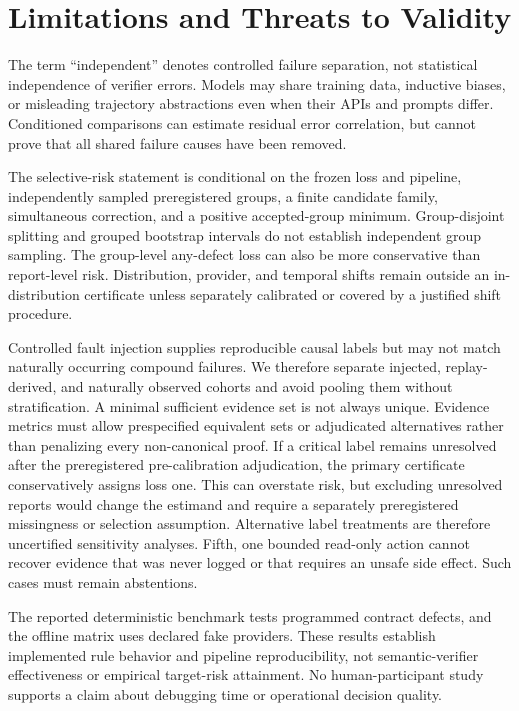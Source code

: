 \section{Limitations and Threats to Validity}
\label{sec:limitations}

The term ``independent'' denotes controlled failure separation, not statistical
independence of verifier errors. Models may share training data, inductive
biases, or misleading trajectory abstractions even when their APIs and prompts
differ. Conditioned comparisons can estimate residual error correlation, but
cannot prove that all shared failure causes have been removed.

The selective-risk statement is conditional on the frozen loss and pipeline,
independently sampled preregistered groups, a finite candidate family,
simultaneous correction, and a positive accepted-group minimum. Group-disjoint
splitting and grouped bootstrap intervals do not establish independent group
sampling. The group-level any-defect loss can also be more conservative than
report-level risk. Distribution, provider, and temporal shifts remain outside
an in-distribution certificate unless separately calibrated or covered by a
justified shift procedure.

Controlled fault injection supplies reproducible causal labels but may
not match naturally occurring compound failures. We therefore separate
injected, replay-derived, and naturally observed cohorts and avoid pooling them
without stratification. A minimal sufficient evidence set is not always
unique. Evidence metrics must allow prespecified equivalent sets or adjudicated
alternatives rather than penalizing every non-canonical proof. If a critical
label remains unresolved after the preregistered pre-calibration adjudication,
the primary certificate conservatively assigns loss one. This can overstate
risk, but excluding unresolved reports would change the estimand and require a
separately preregistered missingness or selection assumption. Alternative label
treatments are therefore uncertified sensitivity analyses. Fifth, one bounded
read-only action cannot recover evidence that was never logged or that requires
an unsafe side effect. Such cases must remain abstentions.

The reported deterministic benchmark tests programmed contract defects, and
the offline matrix uses declared fake providers. These results establish
implemented rule behavior and pipeline reproducibility, not semantic-verifier
effectiveness or empirical target-risk attainment. No human-participant study
supports a claim about debugging time or operational decision quality.
